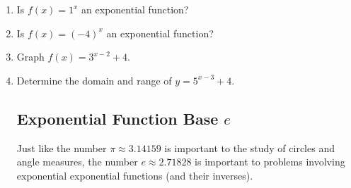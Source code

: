 \begin{enumerate}

\item Is $f(x)=1^x$ an exponential function?\\[.5in]



\item Is $f(x)=(-4)^x$ an exponential function?\\


\newpage
\item Graph $f(x)=3^{x-2}+4.$


\item Determine the domain and range of $y=5^{x-3}+4$.  \\[1in]





\subsection{Exponential Function Base $e$} 
Just like the number $\pi \approx 3.14159$ is important to the study
of circles and angle measures, the number $e \approx 2.71828$ is
important to problems involving exponential exponential functions (and
their inverses).


\end{enumerate}

